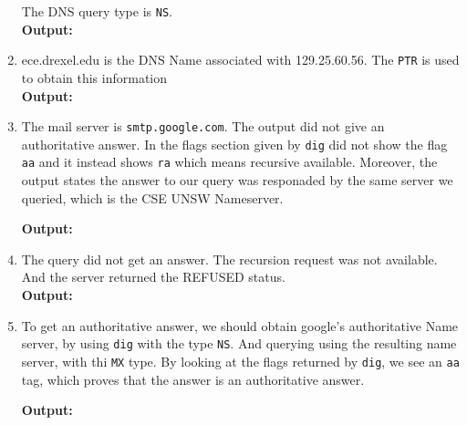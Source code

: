 \documentclass[12pt]{article}
\begin{document}
\begin{enumerate}
        The DNS query type is \lstinline{NS}.\\
        \textbf{Output: }
        
        

    \item ece.drexel.edu is the DNS Name associated with 129.25.60.56. The 
          \lstinline{PTR} is used to obtain this information\\ 

          \textbf{Output: }
          

    \item The mail server is \lstinline{smtp.google.com}. The output did not
        give an authoritative answer. In the flags section given by 
        \lstinline{dig} did not show the flag \lstinline{aa} and it
        instead shows \lstinline{ra} which means recursive available. Moreover, 
        the output states the answer to our query was responaded by the same
        server we queried, which is the CSE UNSW Nameserver.
 
        \textbf{Output: }
        

    \item The query did not get an answer. The recursion request was not 
        available. And the server returned the REFUSED status.\\

        \textbf{Output:}
        

    \item To get an authoritative answer, we should obtain google's 
        authoritative Name server, by using \lstinline{dig} with the type 
        \lstinline{NS}. And querying using the resulting name server, with 
        thi \lstinline{MX} type. By looking at the flags returned by 
        \lstinline{dig}, we see an \lstinline{aa} tag, which proves that 
        the answer is an authoritative answer.

        \textbf{Output: }
        
        


\end{enumerate}
\end{document}
